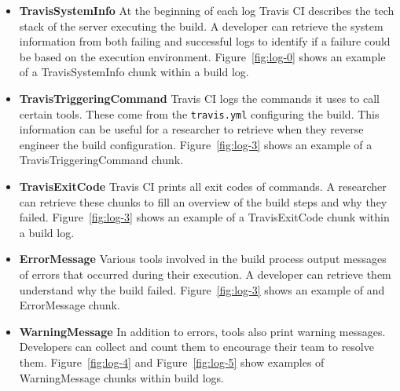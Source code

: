 \documentclass[\myrootdir/main.tex]{subfiles}
\begin{document}
\begin{itemize}
	\item \textbf{TravisSystemInfo} At the beginning of each log Travis CI describes the tech stack of the server executing the build.
				A developer can retrieve the system information from both failing and successful logs to identify if a failure could be based on the execution environment.
	      Figure~\ref{fig:log-0} shows an example of a TravisSystemInfo chunk within a build log.

	\item \textbf{TravisTriggeringCommand} Travis CI logs the commands it uses to call certain tools.
	      These come from the \texttt{travis.yml} configuring the build.
				This information can be useful for a researcher to retrieve when they reverse engineer the build configuration.
	      Figure~\ref{fig:log-3} shows an example of a TravisTriggeringCommand chunk.

	\item \textbf{TravisExitCode} Travis CI prints all exit codes of commands.
				A researcher can retrieve these chunks to fill an overview of the build steps and why they failed.
	      Figure~\ref{fig:log-3} shows an example of a TravisExitCode chunk within a build log.

	\item \textbf{ErrorMessage} Various tools involved in the build process output messages of errors that occurred during their execution.
	      A developer can retrieve them understand why the build failed.
	      Figure~\ref{fig:log-3} shows an example of and ErrorMessage chunk.

	\item \textbf{WarningMessage} In addition to errors, tools also print warning messages.
				Developers can collect and count them to encourage their team to resolve them.
	      Figure~\ref{fig:log-4} and Figure~\ref{fig:log-5} show examples of WarningMessage chunks within build logs.

\end{itemize}
\end{document}
